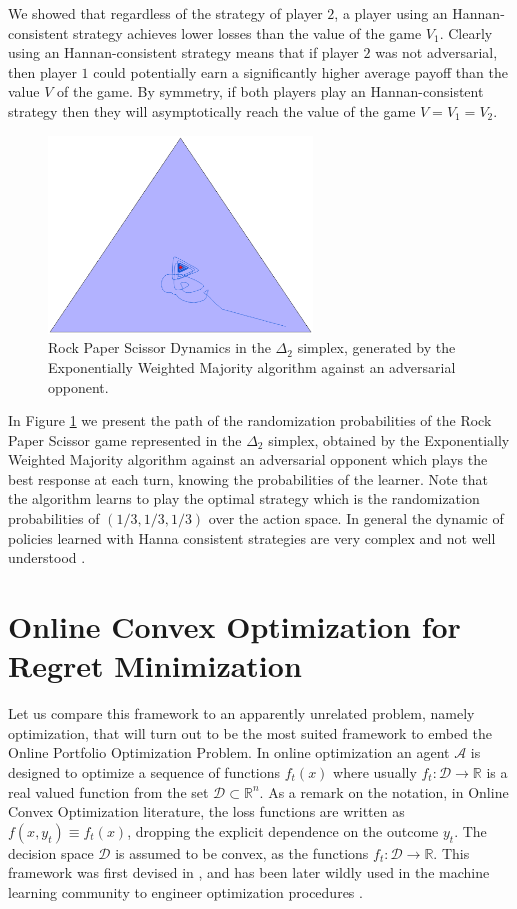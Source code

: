 We showed that regardless of the strategy of player $2$, a player using an Hannan-consistent strategy achieves lower losses than the value of the game $V_1$. Clearly using an Hannan-consistent strategy means that if player $2$ was not adversarial, then player $1$ could potentially earn a significantly higher average payoff than the value $V$ of the game. By symmetry, if both players play an Hannan-consistent strategy then they will asymptotically reach the value of the game $V=V_1=V_2$.

\begin{figure}[!ht]
    \centering
    \includegraphics[width=7cm]{./img/rps_ewm.eps}
\caption{Rock Paper Scissor Dynamics in the $\Delta_2$ simplex, generated by the Exponentially Weighted Majority algorithm against an adversarial opponent.}
\label{fig:RPS}
\end{figure}

In Figure \ref{fig:RPS} we present the path of the randomization probabilities of the Rock Paper Scissor game represented in the $\Delta_{2}$ simplex, obtained by the Exponentially Weighted Majority algorithm against an adversarial opponent which plays the best response at each turn, knowing the probabilities of the learner.
Note that the algorithm learns to play the optimal strategy which is the randomization probabilities of $(1/3,1/3,1/3)$ over the action space. 
In general the dynamic of policies learned with Hanna consistent strategies are very complex and not well understood \cite{bailey2018multiplicative}.

\section{Online Convex Optimization for Regret Minimization}\label{sec:OCO}

Let us compare this framework to an apparently unrelated problem, namely optimization, that will turn out to be the most suited framework to embed the Online Portfolio Optimization Problem. In online optimization an agent $\mathcal A$ is designed to optimize a sequence of functions $f_t(x)$ where usually $f_t:\mathcal D\to \mathbb R$ is a real valued function from the set $\mathcal D\subset\mathbb R^n$. As a remark on the notation, in Online Convex Optimization literature, the loss functions are written as $f(x,y_t)\equiv f_t(x)$, dropping the explicit dependence on the outcome $y_t$.
The decision space $\mathcal D$ is assumed to be convex, as the functions $f_t:\mathcal D\to \mathbb R$. This framework was first devised in \cite{zinkevich2003online}, and has been later wildly used in the machine learning community to engineer optimization procedures \cite{shalev2012online}. 

